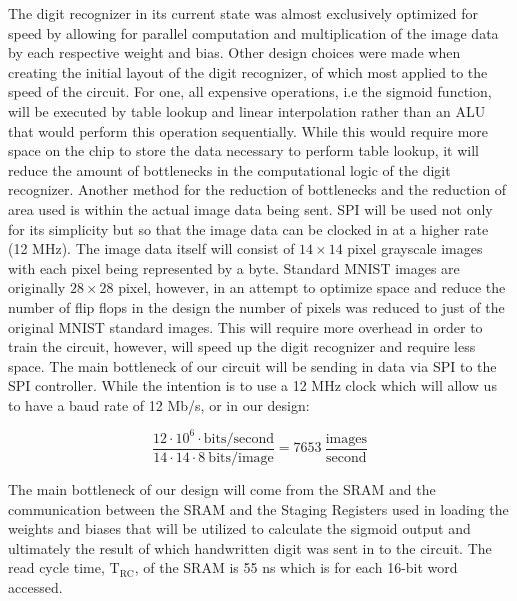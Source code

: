 \documentclass[12pt]{article}
\begin{document}
The digit recognizer in its current state was almost exclusively optimized for speed by allowing for parallel computation and multiplication of the image data by each respective weight and bias. Other design choices were made when creating the initial layout of the digit recognizer, of which most applied to the speed of the circuit. For one, all expensive operations, i.e the sigmoid function, will be executed by table lookup and linear interpolation rather than an ALU that would perform this operation sequentially. While this would require more space on the chip to store the data necessary to perform table lookup, it will reduce the amount of bottlenecks in the computational logic of the digit recognizer. Another method for the reduction of bottlenecks and the reduction of area used is within the actual image data being sent. SPI will be used not only for its simplicity but so that the image data can be clocked in at a higher rate (12 MHz). The image data itself will consist of $14 \times 14$ pixel grayscale images with each pixel being represented by a byte. Standard MNIST images are originally $28 \times 28$ pixel, however, in an attempt to optimize space and reduce the number of flip flops in the design the number of pixels was reduced to just  of the original MNIST standard images. This will require more overhead in order to train the circuit, however, will speed up the digit recognizer and require less space. The main bottleneck of our circuit will be sending in data via SPI to the SPI controller. While the intention is to use a 12 MHz clock which will allow us to have a baud rate of 12 Mb/s, or in our design:

\[ \frac{ 12\cdot 10^6\cdot \textrm{bits/second}} {14\cdot 14\cdot 8\ \textrm{bits/image}} = 7653\  \frac{\textrm{images}}{\textrm{second}} \]

The main bottleneck of our design will come from the SRAM and the communication between the SRAM and the Staging Registers used in loading the weights and biases that will be utilized to calculate the sigmoid output and ultimately the result of which handwritten digit was sent in to the circuit. The read cycle time, $\textrm{T}_\textrm{RC}$, of the SRAM is 55 ns which is for each 16-bit word accessed.





\newpage
\end{document}
